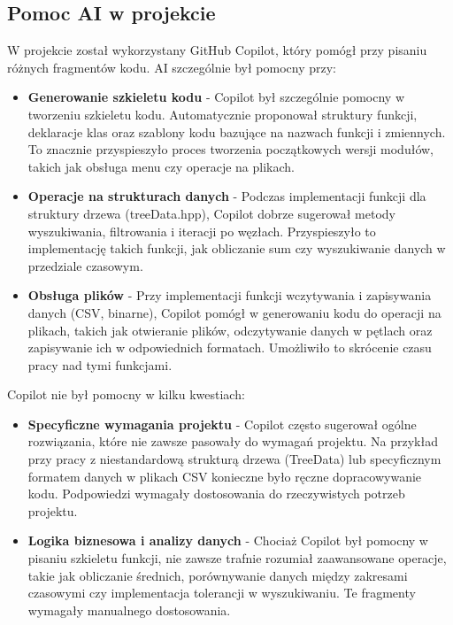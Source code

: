 \subsection{Pomoc AI w projekcie}
W projekcie został wykorzystany GitHub Copilot, który pomógł przy pisaniu różnych fragmentów kodu. AI szczególnie był pomocny przy:
\begin{itemize}
    \item \textbf{Generowanie szkieletu kodu} - Copilot był szczególnie pomocny w tworzeniu szkieletu kodu. Automatycznie proponował struktury funkcji, deklaracje klas oraz szablony kodu bazujące na nazwach funkcji i zmiennych. To znacznie przyspieszyło proces tworzenia początkowych wersji modułów, takich jak obsługa menu czy operacje na plikach.
    \item \textbf{Operacje na strukturach danych} - Podczas implementacji funkcji dla struktury drzewa (treeData.hpp), Copilot dobrze sugerował metody wyszukiwania, filtrowania i iteracji po węzłach. Przyspieszyło to implementację takich funkcji, jak obliczanie sum czy wyszukiwanie danych w przedziale czasowym.
    \item \textbf{Obsługa plików} - Przy implementacji funkcji wczytywania i zapisywania danych (CSV, binarne), Copilot pomógł w generowaniu kodu do operacji na plikach, takich jak otwieranie plików, odczytywanie danych w pętlach oraz zapisywanie ich w odpowiednich formatach. Umożliwiło to skrócenie czasu pracy nad tymi funkcjami.
\end{itemize}
Copilot nie był pomocny w kilku kwestiach:
\begin{itemize}
    \item \textbf{Specyficzne wymagania projektu} - Copilot często sugerował ogólne rozwiązania, które nie zawsze pasowały do wymagań projektu. Na przykład przy pracy z niestandardową strukturą drzewa (TreeData) lub specyficznym formatem danych w plikach CSV konieczne było ręczne dopracowywanie kodu. Podpowiedzi wymagały dostosowania do rzeczywistych potrzeb projektu.
    \item \textbf{Logika biznesowa i analizy danych} - Chociaż Copilot był pomocny w pisaniu szkieletu funkcji, nie zawsze trafnie rozumiał zaawansowane operacje, takie jak obliczanie średnich, porównywanie danych między zakresami czasowymi czy implementacja tolerancji w wyszukiwaniu. Te fragmenty wymagały manualnego dostosowania.
\end{itemize}
